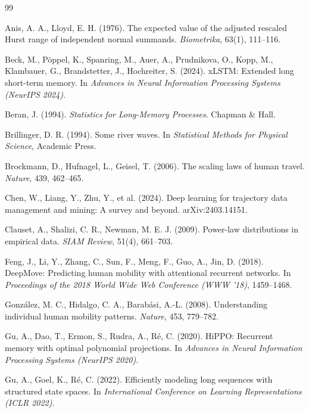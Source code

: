 \begin{thebibliography}{99}

Anis, A. A., Lloyd, E. H. (1976).
The expected value of the adjusted rescaled Hurst range of independent normal summands.
\emph{Biometrika}, 63(1), 111--116.

Beck, M., Pöppel, K., Spanring, M., Auer, A., Prudnikova, O., Kopp, M., Klambauer, G., Brandstetter, J., Hochreiter, S. (2024).
xLSTM: Extended long short-term memory.
In \emph{Advances in Neural Information Processing Systems (NeurIPS 2024)}.

Beran, J. (1994).
\emph{Statistics for Long-Memory Processes}.
Chapman \& Hall.

Brillinger, D. R. (1994).
Some river waves.
In \emph{Statistical Methods for Physical Science}, Academic Press.

Brockmann, D., Hufnagel, L., Geisel, T. (2006).
The scaling laws of human travel.
\emph{Nature}, 439, 462--465.

Chen, W., Liang, Y., Zhu, Y., et al. (2024).
Deep learning for trajectory data management and mining: A survey and beyond.
arXiv:2403.14151.

Clauset, A., Shalizi, C. R., Newman, M. E. J. (2009).
Power-law distributions in empirical data.
\emph{SIAM Review}, 51(4), 661--703.

Feng, J., Li, Y., Zhang, C., Sun, F., Meng, F., Guo, A., Jin, D. (2018).
DeepMove: Predicting human mobility with attentional recurrent networks.
In \emph{Proceedings of the 2018 World Wide Web Conference (WWW '18)}, 1459--1468.

Gonz\'alez, M. C., Hidalgo, C. A., Barab\'asi, A.-L. (2008).
Understanding individual human mobility patterns.
\emph{Nature}, 453, 779--782.

Gu, A., Dao, T., Ermon, S., Rudra, A., Ré, C. (2020).
HiPPO: Recurrent memory with optimal polynomial projections.
In \emph{Advances in Neural Information Processing Systems (NeurIPS 2020)}.

Gu, A., Goel, K., Ré, C. (2022).
Efficiently modeling long sequences with structured state spaces.
In \emph{International Conference on Learning Representations (ICLR 2022)}.


\end{thebibliography}
